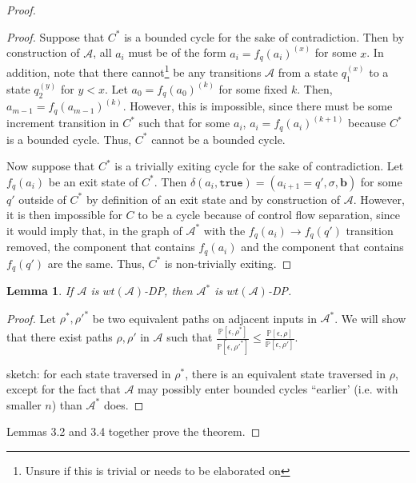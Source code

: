 \documentclass[12pt]{article}
\newcommand{\PP}{\mathbb{P}}
\newtheorem{lemma}[thm]{Lemma}
\theoremstyle{definition}
\begin{document}
\begin{proof}
\begin{proof}
	Suppose that $C^*$ is a bounded cycle for the sake of contradiction. Then by construction of $\mathcal{A}$, all $a_i$ must be of the form $a_i = f_q{(a_i)}^{(x)}$ for some $x$. In addition, note that there cannot\footnote{Unsure if this is trivial or needs to be elaborated on} be any transitions $\mathcal{A}$ from a state $q_1^{(x)}$ to a state $q_2^{(y)}$ for $y < x$. Let $a_0 = f_q(a_0)^{(k)}$ for some fixed $k$. 
	Then, $a_{m-1}=f_q{(a_{m-1})}^{(k)}$. However, this is impossible, since there must be some increment transition in $C^*$ such that for some $a_i$, $a_i = f_q(a_i)^{(k+1)}$ because $C^*$ is a bounded cycle. Thus, $C^*$ cannot be a bounded cycle.

	Now suppose that $C^*$ is a trivially exiting cycle for the sake of contradiction. Let $f_q(a_i)$ be an exit state of $C^*$. Then $\delta(a_i, \texttt{true}) = (a_{i+1} = q', \sigma, \mathbf{b})$ for some $q'$ outside of $C^*$ by definition of an exit state and by construction of $\mathcal{A}$. 
	However, it is then impossible for $C$ to be a cycle because of control flow separation, since it would imply that, in the graph of $\mathcal{A}^*$ with the $f_q(a_i)\to f_q(q')$ transition removed, the component that contains $f_q(a_i)$ and the component that contains $f_q(q')$ are the same. Thus, $C^*$ is non-trivially exiting.
\end{proof}

\begin{lemma}
	If $\mathcal{A}$ is $wt(\mathcal{A})$-DP, then $\mathcal{A}^*$ is $wt(\mathcal{A})$-DP.
\end{lemma}


\begin{proof}
	Let $\rho^*, \rho'^*$ be two equivalent paths on adjacent inputs in $\mathcal{A}^*$. We will show that there exist paths $\rho, \rho'$ in $\mathcal{A}$ such that $\frac{\PP[\epsilon, \rho^*]}{\PP[\epsilon, \rho'^*]}\leq \frac{\PP[\epsilon, \rho]}{\PP[\epsilon, \rho']}$.


	sketch: for each state traversed in $\rho^*$, there is an equivalent state traversed in $\rho$, except for the fact that $\mathcal{A}$ may possibly enter bounded cycles ``earlier' (i.e. with smaller $n$) than $\mathcal{A}^*$ does. 

	



\end{proof}

Lemmas 3.2 and 3.4 together prove the theorem. 
\end{proof}


\end{document}
